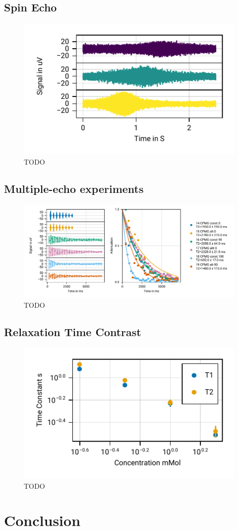 \documentclass[
    parskip=half, 
    twoside=false,
    twocolumn=true,
    fontsize=11pt,
]{scrarticle}
\begin{document}
\subsection{Spin Echo}
\begin{figure}
    \centering
    \includegraphics{figures/04 spin echo shims.pdf}
    \caption{TODO}
\end{figure}

\subsection{Multiple-echo experiments}
\begin{figure}
    \centering
    \includegraphics{figures/05 CPMG.pdf}
    \caption{TODO}
\end{figure}

\subsection{Relaxation Time Contrast}
\begin{figure}
    \centering
    \includegraphics{figures/06 contrast.pdf}
    \caption{TODO}
\end{figure}


\section{Conclusion}

\nocite{*}
\printbibliography
\end{document}
